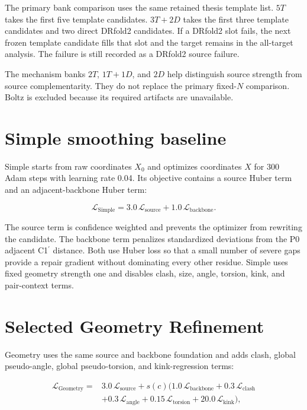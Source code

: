 \documentclass[12pt,a4paper,oneside]{report}
\newcommand{\cprime}{C1$^{\prime}$}
\begin{document}
The primary bank comparison uses the same retained thesis template list. $5T$ takes
the first five template candidates. $3T+2D$ takes the first three template candidates
and two direct DRfold2 candidates. If a DRfold2 slot fails, the next frozen template
candidate fills that slot and the target remains in the all-target analysis. The
failure is still recorded as a DRfold2 source failure.

The mechanism banks $2T$, $1T+1D$, and $2D$ help distinguish source strength from
source complementarity. They do not replace the primary fixed-$N$ comparison. Boltz
is excluded because its required artifacts are unavailable.

\section{Simple smoothing baseline}

Simple starts from raw coordinates $X_0$ and optimizes coordinates $X$ for 300 Adam
steps with learning rate 0.04. Its objective contains a source Huber term and an
adjacent-backbone Huber term:

\begin{equation}
\mathcal{L}_{\mathrm{Simple}}=
3.0\,\mathcal{L}_{\mathrm{source}}+
1.0\,\mathcal{L}_{\mathrm{backbone}}.
\end{equation}

The source term is confidence weighted and prevents the optimizer from rewriting the
candidate. The backbone term penalizes standardized deviations from the P0 adjacent
\cprime{} distance. Both use Huber loss so that a small number of severe gaps provide
a repair gradient without dominating every other residue. Simple uses fixed geometry
strength one and disables clash, size, angle, torsion, kink, and pair-context terms.

\section{Selected Geometry Refinement}

Geometry uses the same source and backbone foundation and adds clash, global
pseudo-angle, global pseudo-torsion, and kink-regression terms:

\begin{equation}
\begin{split}
\mathcal{L}_{\mathrm{Geometry}}={}&
3.0\,\mathcal{L}_{\mathrm{source}} + s(c)\big(
1.0\,\mathcal{L}_{\mathrm{backbone}}+
0.3\,\mathcal{L}_{\mathrm{clash}}\\
&+0.3\,\mathcal{L}_{\mathrm{angle}}+
0.15\,\mathcal{L}_{\mathrm{torsion}}+
20.0\,\mathcal{L}_{\mathrm{kink}}\big),
\end{split}
\end{equation}
\end{document}
